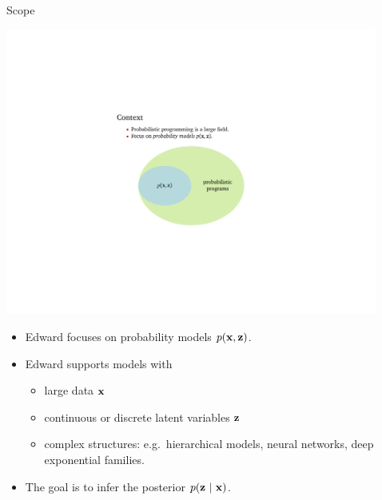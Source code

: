 \documentclass{beamer}
\begin{document}
\begin{frame}[t]
\begin{columns}[t,totalwidth=10in]
\begin{column}{\onecolwid}
\end{column} 

\begin{column}{\sepwid}\end{column} %

\begin{column}{\onecolwid} 

\begin{block}{Scope}
\begin{center}
\includegraphics[width=9in]{img/prob_venn.pdf}
\end{center}
\begin{itemize}
  \item Edward focuses on probability models $p(\boldsymbol{\mathbf{x}},\boldsymbol{\mathbf{z}})$.
  \item Edward supports models with\newline
  \begin{itemize}
    \item large data $\boldsymbol{\mathbf{x}}$
    \item continuous or discrete latent variables $\boldsymbol{\mathbf{z}}$
    \item complex structures: e.g.~hierarchical models, neural networks,
    deep exponential families.
  \end{itemize}
  \item The goal is to infer the posterior $p(\boldsymbol{\mathbf{z}}~\vert~\boldsymbol{\mathbf{x}})$.
\end{itemize}
\end{block}


\end{column}
\end{columns}
\end{frame}
\end{document}
